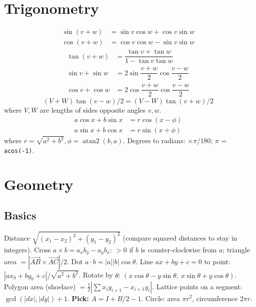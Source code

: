 \section{Trigonometry}
\begin{align*}
\sin(v+w)&{}=\sin v\cos w+\cos v\sin w\\
\cos(v+w)&{}=\cos v\cos w-\sin v\sin w
\end{align*}
\begin{align*}
\tan(v+w)&{}=\dfrac{\tan v+\tan w}{1-\tan v\tan w}\\
\sin v+\sin w&{}=2\sin\dfrac{v+w}{2}\cos\dfrac{v-w}{2}\\
\cos v+\cos w&{}=2\cos\dfrac{v+w}{2}\cos\dfrac{v-w}{2}
\end{align*}
\[ (V+W)\tan(v-w)/2{}=(V-W)\tan(v+w)/2 \]
where $V, W$ are lengths of sides opposite angles $v, w$.
\begin{align*}
	a\cos x+b\sin x&=r\cos(x-\phi)\\
	a\sin x+b\cos x&=r\sin(x+\phi)
\end{align*}
where $r=\sqrt{a^2+b^2}, \phi=\operatorname{atan2}(b,a)$.
Degrees to radians: $\times \pi/180$; $\pi$ = \texttt{acos(-1)}.

\section{Geometry}
\subsection{Basics}
Distance $\sqrt{(x_1-x_2)^2+(y_1-y_2)^2}$ (compare squared distances to stay in integers).
Cross $a\times b = a_xb_y-a_yb_x$: $>0$ if $b$ is counter-clockwise from $a$; triangle area
$= |\vec{AB}\times\vec{AC}|/2$. Dot $a\cdot b = |a||b|\cos\theta$.
Line $ax+by+c=0$ to point: $|ax_0+by_0+c|/\sqrt{a^2+b^2}$.
Rotate by $\theta$: $(x\cos\theta-y\sin\theta,\ x\sin\theta+y\cos\theta)$.
Polygon area (shoelace) $= \frac12\left|\sum x_iy_{i+1}-x_{i+1}y_i\right|$.
Lattice points on a segment: $\gcd(|dx|,|dy|)+1$.
\textbf{Pick:} $A = I + B/2 - 1$. Circle: area $\pi r^2$, circumference $2\pi r$.

